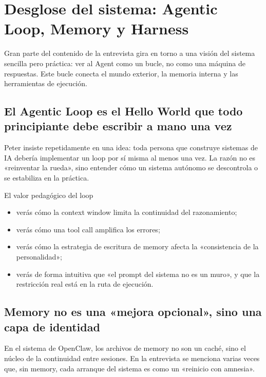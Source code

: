\section{Desglose del sistema: Agentic Loop, Memory y Harness}

Gran parte del contenido de la entrevista gira en torno a una visión del sistema sencilla pero práctica: ver al Agent como un bucle, no como una máquina de respuestas. Este bucle conecta el mundo exterior, la memoria interna y las herramientas de ejecución.

\subsection{El Agentic Loop es el Hello World que todo principiante debe escribir a mano una vez}

Peter insiste repetidamente en una idea: toda persona que construye sistemas de IA debería implementar un loop por sí misma al menos una vez. La razón no es «reinventar la rueda», sino entender cómo un sistema autónomo se descontrola o se estabiliza en la práctica.

\begin{importantbox}{El valor pedagógico del loop}
\begin{itemize}
    \item verás cómo la context window limita la continuidad del razonamiento;
    \item verás cómo una tool call amplifica los errores;
    \item verás cómo la estrategia de escritura de memory afecta la «consistencia de la personalidad»;
    \item verás de forma intuitiva que «el prompt del sistema no es un muro», y que la restricción real está en la ruta de ejecución.
\end{itemize}
\end{importantbox}

\subsection{Memory no es una «mejora opcional», sino una capa de identidad}

En el sistema de OpenClaw, los archivos de memory no son un caché, sino el núcleo de la continuidad entre sesiones. En la entrevista se menciona varias veces que, sin memory, cada arranque del sistema es como un «reinicio con amnesia».


